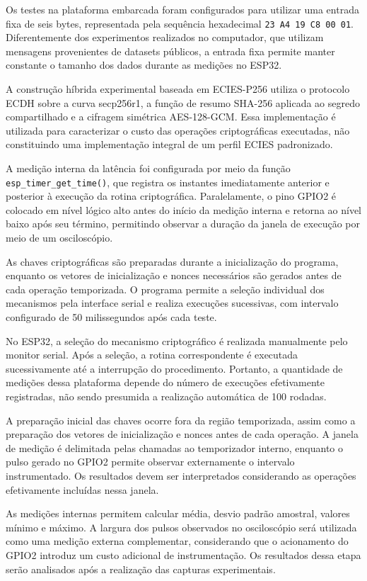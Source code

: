 Os testes na plataforma embarcada foram configurados para utilizar uma entrada fixa de seis bytes, representada pela sequência hexadecimal \texttt{23 A4 19 C8 00 01}. Diferentemente dos experimentos realizados no computador, que utilizam mensagens provenientes de datasets públicos, a entrada fixa permite manter constante o tamanho dos dados durante as medições no ESP32.

A construção híbrida experimental baseada em ECIES-P256 utiliza o protocolo ECDH sobre a curva secp256r1, a função de resumo SHA-256 aplicada ao segredo compartilhado e a cifragem simétrica AES-128-GCM. Essa implementação é utilizada para caracterizar o custo das operações criptográficas executadas, não constituindo uma implementação integral de um perfil ECIES padronizado.

A medição interna da latência foi configurada por meio da função \texttt{esp\_timer\_get\_time()}, que registra os instantes imediatamente anterior e posterior à execução da rotina criptográfica. Paralelamente, o pino GPIO2 é colocado em nível lógico alto antes do início da medição interna e retorna ao nível baixo após seu término, permitindo observar a duração da janela de execução por meio de um osciloscópio.

As chaves criptográficas são preparadas durante a inicialização do programa, enquanto os vetores de inicialização e nonces necessários são gerados antes de cada operação temporizada. O programa permite a seleção individual dos mecanismos pela interface serial e realiza execuções sucessivas, com intervalo configurado de 50 milissegundos após cada teste.

No ESP32, a seleção do mecanismo criptográfico é realizada manualmente pelo monitor serial. Após a seleção, a rotina correspondente é executada sucessivamente até a interrupção do procedimento. Portanto, a quantidade de medições dessa plataforma depende do número de execuções efetivamente registradas, não sendo presumida a realização automática de 100 rodadas.

A preparação inicial das chaves ocorre fora da região temporizada, assim como a preparação dos vetores de inicialização e nonces antes de cada operação. A janela de medição é delimitada pelas chamadas ao temporizador interno, enquanto o pulso gerado no GPIO2 permite observar externamente o intervalo instrumentado. Os resultados devem ser interpretados considerando as operações efetivamente incluídas nessa janela.

As medições internas permitem calcular média, desvio padrão amostral, valores mínimo e máximo. A largura dos pulsos observados no osciloscópio será utilizada como uma medição externa complementar, considerando que o acionamento do GPIO2 introduz um custo adicional de instrumentação. Os resultados dessa etapa serão analisados após a realização das capturas experimentais.


